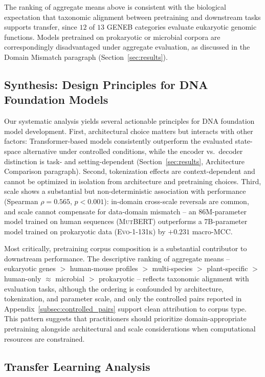 \documentclass{article}
\theoremstyle{plain}
\theoremstyle{definition}
\theoremstyle{remark}
\begin{document}
The ranking of aggregate means above is consistent with the
biological expectation that taxonomic alignment between pretraining
and downstream tasks supports transfer, since $12$ of $13$ GENEB
categories evaluate eukaryotic genomic functions. Models pretrained
on prokaryotic or microbial corpora are correspondingly disadvantaged
under aggregate evaluation, as discussed in the Domain Mismatch
paragraph (Section~\ref{sec:results}).

\subsection{Synthesis: Design Principles for DNA Foundation Models}
\label{subsec:synthesis}

Our systematic analysis yields several actionable principles for DNA
foundation model development. First, architectural choice matters but
interacts with other factors: Transformer-based models consistently
outperform the evaluated state-space alternative under controlled
conditions, while the encoder vs.\ decoder distinction is task- and
setting-dependent (Section~\ref{sec:results}, Architecture Comparison
paragraph). Second, tokenization effects are context-dependent and
cannot be optimized in isolation from architecture and pretraining
choices. Third, scale shows a substantial but non-deterministic
association with performance (Spearman $\rho = 0.565$, $p < 0.001$):
in-domain cross-scale reversals are common, and scale cannot
compensate for data-domain mismatch -- an 86M-parameter model trained
on human sequences (\textsc{MutBERT}) outperforms a 7B-parameter
model trained on prokaryotic data (\textsc{Evo-1-131k}) by $+0.231$
macro-MCC.

Most critically, pretraining corpus composition is a substantial
contributor to downstream performance. The descriptive ranking of
aggregate means -- eukaryotic genes $>$ human-mouse profiles $>$
multi-species $>$ plant-specific $>$ human-only $\approx$ microbial
$>$ prokaryotic -- reflects taxonomic alignment with evaluation
tasks, although the ordering is confounded by architecture,
tokenization, and parameter scale, and only the controlled pairs
reported in Appendix~\ref{subsec:controlled_pairs} support clean
attribution to corpus type. This pattern suggests that practitioners
should prioritize domain-appropriate pretraining alongside
architectural and scale considerations when computational resources
are constrained.

\subsection{Transfer Learning Analysis}
\label{subsec:transfer_learning}
\end{document}
